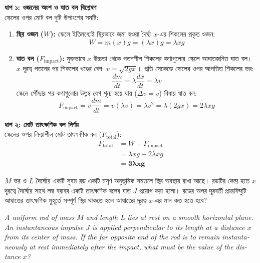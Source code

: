 \documentclass[12pt, a4paper]{article}
\begin{document}
\begin{tcolorbox}[solutionbox={সমাধান (Solution)}]
    \noindent
    \textbf{ধাপ ১: ওজনের অংশ ও ঘাত বল বিশ্লেষণ} \\
    স্কেলের ওপর মোট বল দুটি উপাংশের সমষ্টি:
    \begin{enumerate}[topsep=0pt, itemsep=2pt]
        \item \textbf{স্থির ওজন ($W$):} স্কেলে ইতিমধ্যেই স্থিরভাবে জমা হওয়া দৈর্ঘ্য $x$-এর শিকলের প্রকৃত ওজন:
        \[ W = m(x) g = (\lambda x) g = \lambda x g \]
        \item \textbf{ঘাত বল ($F_{\text{impact}}$):} মুক্তভাবে $x$ উচ্চতা থেকে পতনশীল শিকলের কণাগুলোর স্কেলে আঘাতজনিত ঘাত বল। $x$ দূরত্ব পতনের পর শিকলের খণ্ডের বেগ: $v = \sqrt{2gx}$। 
        প্রতি সেকেন্ডে স্কেলের ওপর আপতিত শিকলের ভর:
        \[ \frac{dm}{dt} = \lambda \frac{dx}{dt} = \lambda v \]
        স্কেলে পৌঁছার পর কণাগুলোর উল্লম্ব বেগ শূন্য হয়ে যায় ($\Delta v = v$) বিধায় ঘাত বল:
        \[ F_{\text{impact}} = v \frac{dm}{dt} = v (\lambda v) = \lambda v^2 = \lambda (2gx) = 2\lambda x g \]
    \end{enumerate}
    
    \vspace{0.5em}
    \noindent\textbf{ধাপ ২: মোট তাৎক্ষণিক বল নির্ণয়} \\
    স্কেলের ওপর ক্রিয়াশীল মোট তাৎক্ষণিক বল ($F_{\text{total}}$):
    \begin{align*}
        F_{\text{total}} &= W + F_{\text{impact}} \\
        &= \lambda x g + 2\lambda x g \\
        &= \mathbf{3\lambda x g}
    \end{align*}
\end{tcolorbox}

\newpage

\begin{tcolorbox}[questionbox={প্রশ্ন (Question) 12}]
    \noindent
    $M$ ভর ও $L$ দৈর্ঘ্যের একটি সুষম রড একটি মসৃণ অনুভূমিক সমতলে স্থির অবস্থায় রাখা আছে। রডটির কেন্দ্র হতে $x$ দূরত্বে দৈর্ঘ্যের সাথে লম্ব বরাবর একটি তাৎক্ষণিক বলের ঘাত $J$ প্রয়োগ করা হলো। রডের অপর দূরবর্তী প্রান্তবিন্দুটি আঘাতের তাৎক্ষণিক মুহূর্তে সম্পূর্ণ স্থির থাকতে হলে আঘাতের দূরত্ব $x$-এর মান কত হতে হবে?
    
    \vspace{0.8em}
    \begin{english}
    \noindent\textit{\color{darkgray}
    A uniform rod of mass $M$ and length $L$ lies at rest on a smooth horizontal plane. An instantaneous impulse $J$ is applied perpendicular to its length at a distance $x$ from its center of mass. If the far opposite end of the rod is to remain instantaneously at rest immediately after the impact, what must be the value of the distance $x$?
    }
    \end{english}
\end{tcolorbox}
\end{document}
